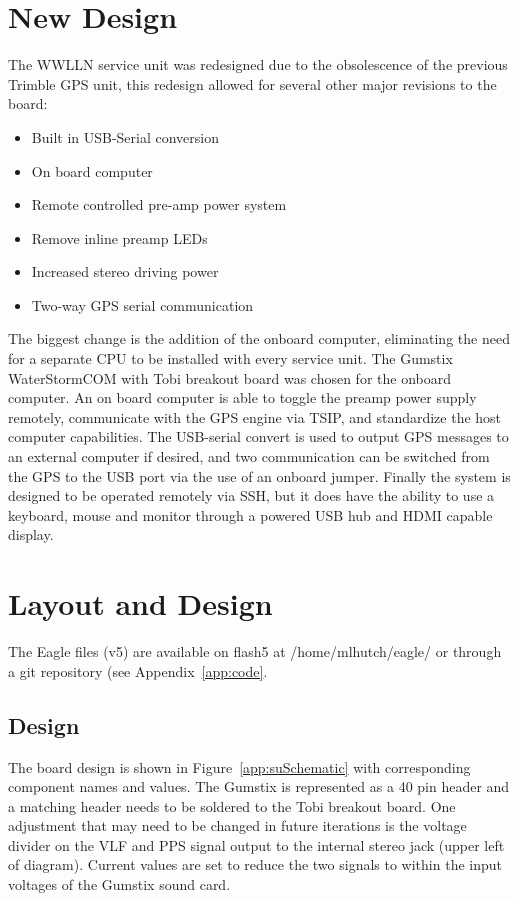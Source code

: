 \section{New Design}

The WWLLN service unit was redesigned due to the obsolescence of the previous Trimble GPS unit, this redesign allowed for several other major revisions to the board:

\begin{itemize}
\item{Built in USB-Serial conversion}
\item{On board computer}
\item{Remote controlled pre-amp power system}
\item{Remove inline preamp LEDs}
\item{Increased stereo driving power}
\item{Two-way GPS serial communication}
\end{itemize}

The biggest change is the addition of the onboard computer, eliminating the need for a separate CPU to be installed with every service unit.
The Gumstix WaterStormCOM with Tobi breakout board was chosen for the onboard computer.
An on board computer is able to toggle the preamp power supply remotely, communicate with the GPS engine via TSIP, and standardize the host computer capabilities.
The USB-serial convert is used to output GPS messages to an external computer if desired, and two communication can be switched from the GPS to the USB port via the use of an onboard jumper.
Finally the system is designed to be operated remotely via SSH, but it does have the ability to use a keyboard, mouse and monitor through a powered USB hub and HDMI capable display.

\section{Layout and Design}

The Eagle files (v5) are available on flash5 at /home/mlhutch/eagle/ or through a git repository (see Appendix~\ref{app:code}. 

\subsection{Design}

The board design is shown in Figure~\ref{app:suSchematic} with corresponding component names and values.
The Gumstix is represented as a 40 pin header and a matching header needs to be soldered to the Tobi breakout board.
One adjustment that may need to be changed in future iterations is the voltage divider on the VLF and PPS signal output to the internal stereo jack (upper left of diagram).
Current values are set to reduce the two signals to within the input voltages of the Gumstix sound card.

